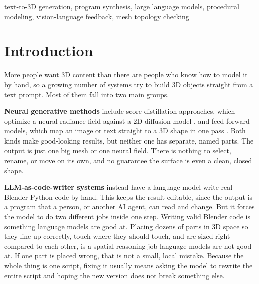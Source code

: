 \documentclass[conference]{IEEEtran}
\begin{document}
\begin{abstract}
\end{abstract}

\begin{IEEEkeywords}
text-to-3D generation, program synthesis, large language models, procedural modeling, vision-language feedback, mesh topology checking
\end{IEEEkeywords}

\section{Introduction}

More people want 3D content than there are people who know how to model it by hand, so a growing number of systems try to build 3D objects straight from a text prompt. Most of them fall into two main groups.

\textbf{Neural generative methods} include score-distillation approaches, which optimize a neural radiance field against a 2D diffusion model \cite{poole2023dreamfusion,lin2023magic3d,chen2023fantasia3d}, and feed-forward models, which map an image or text straight to a 3D shape in one pass \cite{jun2023shape,tochilkin2024triposr,xiang2024trellis}. Both kinds make good-looking results, but neither one has separate, named parts. The output is just one big mesh or one neural field. There is nothing to select, rename, or move on its own, and no guarantee the surface is even a clean, closed shape.

\textbf{LLM-as-code-writer systems} \cite{lu2025ll3m,yang2024scenecraft} instead have a language model write real Blender Python code by hand. This keeps the result editable, since the output is a program that a person, or another AI agent, can read and change. But it forces the model to do two different jobs inside one step. Writing valid Blender code is something language models are good at. Placing dozens of parts in 3D space so they line up correctly, touch where they should touch, and are sized right compared to each other, is a spatial reasoning job language models are not good at. If one part is placed wrong, that is not a small, local mistake. Because the whole thing is one script, fixing it usually means asking the model to rewrite the entire script and hoping the new version does not break something else.
\end{document}
